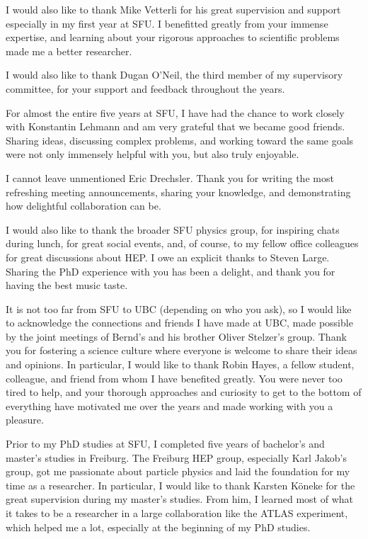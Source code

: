 I would also like to thank Mike Vetterli for his great supervision and support especially in my first year at SFU. 
I benefitted greatly from your immense expertise, and learning about your rigorous approaches to scientific problems made me a better researcher. 

I would also like to thank Dugan O'Neil, the third member of my supervisory committee, for your support and feedback throughout the years. 

For almost the entire five years at SFU, I have had the chance to work closely with Konstantin Lehmann and am very grateful that we became good friends. Sharing ideas, discussing complex problems, and working toward the same goals were not only immensely helpful with you, but also truly enjoyable. 

I cannot leave unmentioned Eric Drechsler. Thank you for writing the most refreshing meeting announcements, sharing your knowledge, and demonstrating how delightful collaboration can be.

I would also like to thank the broader SFU physics group, for inspiring chats during lunch, for great social events, and, of course, to my fellow office colleagues for great discussions about HEP.
I owe an explicit thanks to Steven Large. Sharing the PhD experience with you has been a delight, and thank you for having the best music taste. 

It is not too far from SFU to UBC (depending on who you ask), so I would like to acknowledge the connections and friends I have made at UBC, made possible by the joint meetings of Bernd's and his brother Oliver Stelzer's group. 
Thank you for fostering a science culture where everyone is welcome to share their ideas and opinions. 
In particular, I would like to thank Robin Hayes, a fellow student, colleague, and friend from whom I have benefited greatly. You were never too tired to help, and your thorough approaches and curiosity to get to the bottom of everything have motivated me over the years and made working with you a pleasure. 

Prior to my PhD studies at SFU, I completed five years of bachelor's and master's studies in Freiburg. 
The Freiburg HEP group, especially Karl Jakob's group, got me passionate about particle physics and laid the foundation for my time as a researcher.
In particular, I would like to thank Karsten Köneke for the great supervision during my master's studies.
From him, I learned most of what it takes to be a researcher in a large collaboration like the ATLAS experiment, which helped me a lot, especially at the beginning of my PhD studies.

